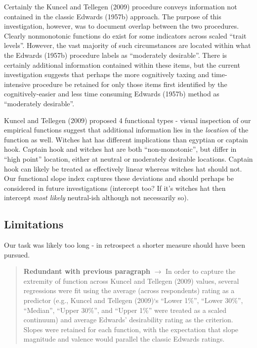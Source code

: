 \documentclass[
  ,jou]{apa6}
\begin{document}
Certainly the Kuncel and Tellegen (2009) procedure conveys information not contained in the classic Edwards (1957b) approach. The purpose of this investigation, however, was to document overlap between the two procedures. Clearly nonmonotonic functions do exist for some indicators across scaled ``trait levels''. However, the vast majority of such circumstances are located within what the Edwards (1957b) procedure labels as ``moderately desirable''. There is certainly additional information contained within these items, but the current investigation suggests that perhaps the more cognitively taxing and time-intensive procedure be retained for only those items first identified by the cognitively-easier and less time consuming Edwards (1957b) method as ``moderately desirable''.

Kuncel and Tellegen (2009) proposed 4 functional types - visual inspection of our empirical functions suggest that additional information lies in the \emph{location} of the function as well. Witches hat has different implications than egyptian or captain hook. Captain hook and witches hat are both ``non-monotonic'', but differ in ``high point'' location, either at neutral or moderately desirable locations. Captain hook can likely be treated as effectively linear whereas witches hat should not. Our functional slope index captures these deviations and should perhaps be considered in future investigations (intercept too? If it's witches hat then intercept \emph{most likely} neutral-ish although not necessarily so).

\hypertarget{limitations}{%
\subsection{Limitations}\label{limitations}}

Our task was likely too long - in retrospect a shorter measure should have been pursued.

\begin{quote}
\textbf{Redundant with previous paragraph} \(\rightarrow\) In order to capture the extremity of function across Kuncel and Tellegen (2009) values, several regressions were fit using the average (across respondents) rating as a predictor (e.g., Kuncel and Tellegen (2009)`s ``Lower 1\%'', ``Lower 30\%'', ``Median'', ``Upper 30\%'', and ``Upper 1\%'' were treated as a scaled continuum) and average Edwards' desirability rating as the criterion. Slopes were retained for each function, with the expectation that slope magnitude and valence would parallel the classic Edwards ratings.
\end{quote}
\end{document}
